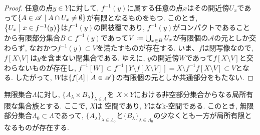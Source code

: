 \documentclass[uplatex, dvipdfmx, a4paper, 12pt, class=jsbook, crop=false]{standalone}
\begin{document}
\begin{proof}
	任意の点$ y \in Y $に対して, $ f^{-1}(y) $に属する任意の点$ x $はその開近傍$ U_x $であって$ \setcomp{A \in \mathscr{A}}{A \cap U_x \neq \emptyset} $が有限となるものをもつ. このとき, $ \setcomp{U_x}{x \in f^{-1}(y)} $は$ f^{-1}(y) $の開被覆であり, $ f^{-1}(y) $がコンパクトであることから有限部分集合$ B \subset f^{-1}(y) $であって$ V \mathrel{:=} \bigcup_{x \in B} U_x $が有限個の$ \mathscr{A} $の元としか交わらず, なおかつ$ f^{-1}(y) \subset V $を満たすものが存在する. いま、$ f $は閉写像なので, $ f[X \setminus V] $は$ y $を含まない閉集合である. ゆえに, $ y $の開近傍$ W $であって$ f[X \setminus V] $と交わらないものが存在し, $ f^{-1}[W] \subset f^{-1}[Y \setminus f[X \setminus V]] = X \setminus f^{-1}f[X \setminus V] \subset V $となる. したがって, $ W $は$ \setcomp{f[A]}{A \in \mathscr{A}} $の有限個の元としか共通部分をもたない.

\end{proof}

\begin{lemma}
	\label{lemma:Lemma for the proof that every product of pseudocompact space X and pseudocompact k space is also pseudocompact in a class of T3.5 space}
	無限集合$ \Lambda $に対し, $ \{A_\lambda \times B_\lambda\}_{\lambda \in \Lambda} $を
	$ X \times Y $における非空部分集合からなる局所有限な集合族とする.
	ここで, $ X $は \Hausdorff 空間であり, $ Y $は\Hausdorff なk-空間である.
	このとき, 無限部分集合$ \Lambda_0 \subset \Lambda $であって,
	$ \{A_\lambda\}_{\lambda \in \Lambda_0} $と$ \{B_\lambda\}_{\lambda \in \Lambda_0} $の少なくとも一方が局所有限となるものが存在する.
\end{lemma}
\end{document}
